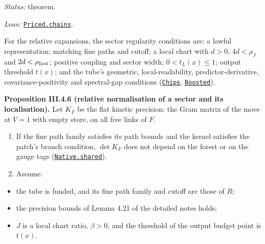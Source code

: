 \documentclass[
  letterpaper,
  11pt]{article}
\providecommand{\tightlist}{%
  \setlength{\itemsep}{0pt}\setlength{\parskip}{0pt}}
\begin{document}
\emph{Status:} theorem.

\emph{Lean:}
\href{https://github.com/yang-mills-group/OpenAI-YM-20261028/blob/3456e5e75cf8d4cd558955a5c7638fba2d68f464/YM/AnalyticBridge/RELATIVE_LOGDET_TRACE/Series.lean\#L203-L227}{\texttt{Priced.chains}}.

For the relative expansions, the sector regularity conditions are: a
lawful representation; matching fine paths and cutoff; a local chart
with \(d>0\), \(4d<\rho_J\) and \(2d<\rho_{\rm first}\); positive
coupling and sector width; \(0<t_L(x)\le1\); output threshold \(t(x)\);
and the tube's geometric, local-readability, predictor-derivative,
covariance-positivity and spectral-gap conditions
(\href{https://github.com/yang-mills-group/OpenAI-YM-20261028/blob/3456e5e75cf8d4cd558955a5c7638fba2d68f464/YM/PhysicalNext/AFTERNOON_INTERACTING_RANK_COMPARISON/Opacity/Desk.lean\#L41-L54}{\texttt{Chips}},
\href{https://github.com/yang-mills-group/OpenAI-YM-20261028/blob/3456e5e75cf8d4cd558955a5c7638fba2d68f464/YM/PhysicalNext/AFTERNOON_INTERACTING_RANK_COMPARISON/Exposure.lean\#L40-L46}{\texttt{Boosted}}).

\textbf{Proposition III.4.6 (relative normalisation of a sector and its
localisation).} Let \(K_F\) be the flat kinetic precision: the Gram
matrix of the move at \(V=1\) with empty store, on all free links of
\(F\).

\begin{enumerate}
\def\labelenumi{(\roman{enumi})}
\item
  If the fine path family satisfies its path bounds and the kernel
  satisfies the patch's branch condition, \(\det K_F\) does not depend
  on the forest or on the gauge tags
  (\href{https://github.com/yang-mills-group/OpenAI-YM-20261028/blob/3456e5e75cf8d4cd558955a5c7638fba2d68f464/YM/SectorNext/GAUSSIAN_SECTOR_CHANGE/Bore.lean\#L303-L305}{\texttt{Native.shared}}).
\item
  Assume:
\end{enumerate}

\begin{itemize}
\tightlist
\item
  the tube is funded, and its fine path family and cutoff are those of
  \(R\);
\item
  the precision bounds of Lemma 4.21 of the detailed notes holds;
\item
  \(J\) is a local chart ratio, \(\beta>0\), and the threshold of the
  output budget point is \(t(x)\).
\end{itemize}
\end{document}

